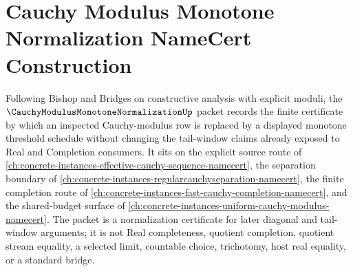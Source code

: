 \chapter{Cauchy Modulus Monotone Normalization NameCert Construction}
\label{ch:concrete-instances-cauchy-modulus-monotone-normalization-namecert}

Following Bishop and Bridges on constructive analysis with explicit moduli, the $\CauchyModulusMonotoneNormalizationUp$ packet records the finite certificate by which an inspected Cauchy-modulus row is replaced by a displayed monotone threshold schedule without changing the tail-window claims already exposed to Real and Completion consumers. It sits on the explicit source route of \autoref{ch:concrete-instances-effective-cauchy-sequence-namecert}, the separation boundary of \autoref{ch:concrete-instances-regularcauchyseparation-namecert}, the finite completion route of \autoref{ch:concrete-instances-fast-cauchy-completion-namecert}, and the shared-budget surface of \autoref{ch:concrete-instances-uniform-cauchy-modulus-namecert}. The packet is a normalization certificate for later diagonal and tail-window arguments; it is not Real completeness, quotient completion, quotient stream equality, a selected limit, countable choice, trichotomy, host real equality, or a standard bridge.

